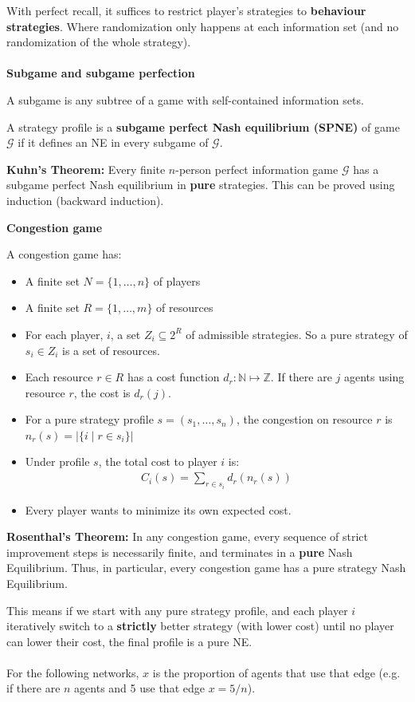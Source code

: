 \documentclass{article}
\begin{document}
With perfect recall, it suffices to restrict player's strategies to \textbf{behaviour strategies}. Where randomization only happens at each information set (and no randomization of the whole strategy).
\\~\\
\textbf{Subgame and subgame perfection}

A subgame is any subtree of a game with self-contained information sets.

A strategy profile is a \textbf{subgame perfect Nash equilibrium (SPNE)} of game $\mathcal{G}$ if it defines an NE in every subgame of $\mathcal{G}$.

\textbf{Kuhn's Theorem: } Every finite $n$-person perfect information game $\mathcal{G}$ has a subgame perfect Nash equilibrium in \textbf{pure} strategies. This can be proved using induction (backward induction).

\newpage
\textbf{Congestion game}

A congestion game has:
\begin{itemize}
\item A finite set $N = \{1,\ldots,n\}$ of players
\item A finite set $R = \{1, \ldots,m\}$ of resources
\item For each player, $i$, a set $Z_i \subseteq 2^R$ of admissible strategies. So a pure strategy of $s_i\in Z_i$ is a set of resources.
\item Each resource $r\in R$ has a cost function $d_r:\mathbb{N}\mapsto \mathbb{Z}$. If there are $j$ agents using resource $r$, the cost is $d_r(j)$.
\item For a pure strategy profile $s = (s_1, \ldots, s_n)$, the congestion on resource $r$ is $n_r(s) = |\{i\mid r \in s_i\}|$
\item Under profile $s$, the total cost to player $i$ is:
\begin{align*}
	C_i(s) = \sum_{r\in s_i} d_r(n_r(s))
\end{align*} 
\item Every player wants to minimize its own expected cost.
\end{itemize}


\textbf{Rosenthal's Theorem: } In any congestion game, every sequence of strict improvement steps is necessarily finite, and terminates in a \textbf{pure} Nash Equilibrium. Thus, in particular, every congestion game has a pure strategy Nash Equilibrium.

This means if we start with any pure strategy profile, and each player $i$ iteratively switch to a \textbf{strictly} better strategy (with lower cost) until no player can lower their cost, the final profile is a pure NE.
\\~\\
For the following networks, $x$ is the proportion of agents that use that edge (e.g. if there are $n$ agents and 5 use that edge $x=5/n$).
\end{document}
